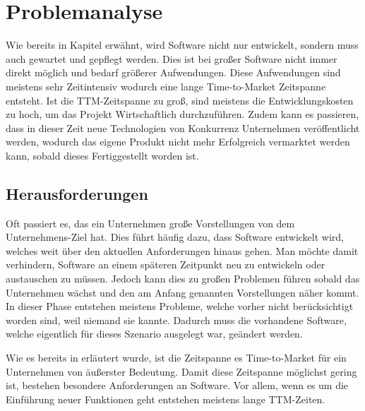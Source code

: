 \chapter{Problemanalyse}
\label{chap:analyse}
Wie bereits in Kapitel  erwähnt, wird Software nicht nur entwickelt, sondern muss auch gewartet und gepflegt werden. Dies ist bei großer Software nicht immer direkt möglich und bedarf größerer Aufwendungen. Diese Aufwendungen sind meistens sehr Zeitintensiv wodurch eine lange Time-to-Market Zeitspanne entsteht. Ist die TTM-Zeitspanne zu groß, sind meistens die Entwicklungskosten zu hoch, um das Projekt Wirtschaftlich durchzuführen. Zudem kann es passieren, dass in dieser Zeit neue Technologien von Konkurrenz Unternehmen veröffentlicht werden, wodurch das eigene Produkt nicht mehr Erfolgreich vermarktet werden kann, sobald dieses Fertiggestellt worden ist.

\section{Herausforderungen}
\label{sec:herausforderung}
Oft passiert es, das ein Unternehmen große Vorstellungen von dem Unternehmens-Ziel hat. Dies führt häufig dazu, dass Software entwickelt wird, welches weit über den aktuellen Anforderungen hinaus gehen. Man möchte damit verhindern, Software an einem späteren Zeitpunkt neu zu entwickeln oder austauschen zu müssen. Jedoch kann dies zu großen Problemen führen sobald das Unternehmen wächst und den am Anfang genannten Vorstellungen näher kommt. In dieser Phase entstehen meistens Probleme, welche vorher nicht berücksichtigt worden sind, weil niemand sie kannte. Dadurch muss die vorhandene Software, welche eigentlich für dieses Szenario ausgelegt war, geändert werden.

Wie es bereits in  erläutert wurde, ist die Zeitspanne es Time-to-Market für ein Unternehmen von äußerster Bedeutung. Damit diese Zeitspanne möglichst gering ist, bestehen besondere Anforderungen an Software. Vor allem, wenn es um die Einführung neuer Funktionen geht entstehen meistens lange TTM-Zeiten. 

